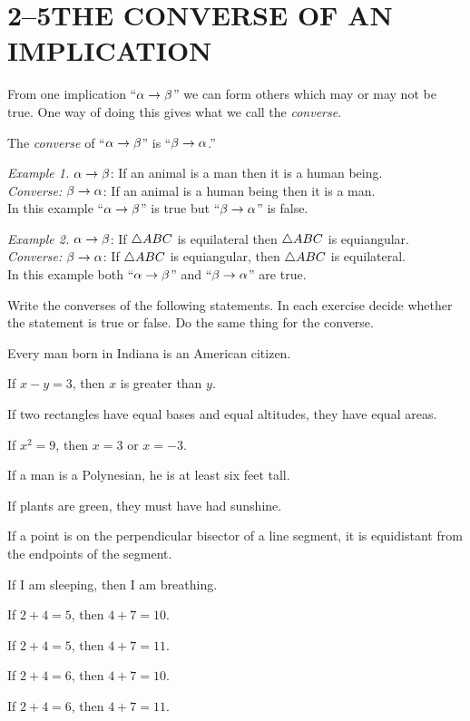 \documentclass[11pt]{book}
\begin{document}
\section*{2--5\quad THE CONVERSE OF AN IMPLICATION}

From one implication ``$\alpha \rightarrow \beta$'' we can form others which may or may not be
true. One way of doing this gives what we call the \emph{converse}.

\begin{definition}
The \emph{converse} of ``$\alpha \rightarrow \beta$'' is ``$\beta \rightarrow \alpha$.''
\end{definition}

\emph{Example 1.} $\alpha \rightarrow \beta$: If an animal is a man then it is a human being.\\
\emph{Converse:} $\beta \rightarrow \alpha$: If an animal is a human being then it is a man.\\
In this example ``$\alpha \rightarrow \beta$'' is true but ``$\beta \rightarrow \alpha$'' is false.

\medskip
\emph{Example 2.} $\alpha \rightarrow \beta$: If $\triangle ABC$ is equilateral then $\triangle ABC$
is equiangular.\\
\emph{Converse:} $\beta \rightarrow \alpha$: If $\triangle ABC$ is equiangular, then $\triangle ABC$
is equilateral.\\
In this example both ``$\alpha \rightarrow \beta$'' and ``$\beta \rightarrow \alpha$'' are true.


Write the converses of the following statements. In each exercise decide whether
the statement is true or false. Do the same thing for the converse.

\begin{exercisecols}
\begin{exlist}
\item Every man born in Indiana is an American citizen.
\item If $x - y = 3$, then $x$ is greater than $y$.
\item If two rectangles have equal bases and equal altitudes, they have equal
      areas.
\item If $x^2 = 9$, then $x = 3$ or $x = -3$.
\item If a man is a Polynesian, he is at least six feet tall.
\item If plants are green, they must have had sunshine.
\item If a point is on the perpendicular bisector of a line segment, it is
      equidistant from the endpoints of the segment.
\item If I am sleeping, then I am breathing.
\item If $2 + 4 = 5$, then $4 + 7 = 10$.
\item If $2 + 4 = 5$, then $4 + 7 = 11$.
\item If $2 + 4 = 6$, then $4 + 7 = 10$.
\item If $2 + 4 = 6$, then $4 + 7 = 11$.
\end{exlist}
\end{exercisecols}
\end{document}
